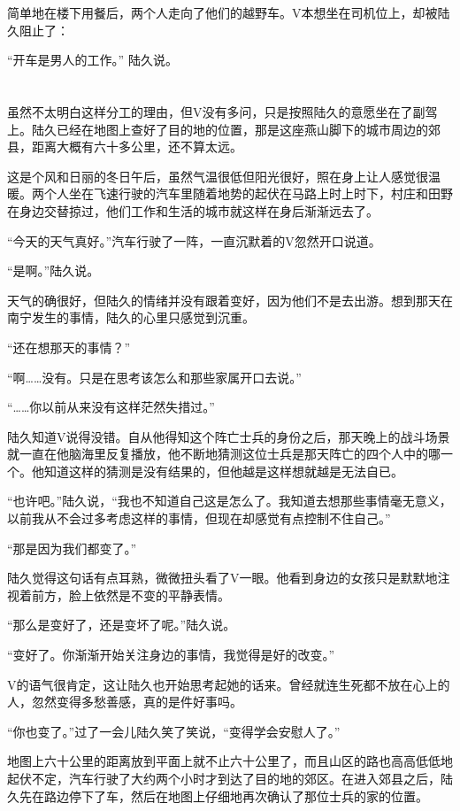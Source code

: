 简单地在楼下用餐后，两个人走向了他们的越野车。V本想坐在司机位上，却被陆久阻止了：

“开车是男人的工作。” 陆久说。

\section*{}

虽然不太明白这样分工的理由，但V没有多问，只是按照陆久的意愿坐在了副驾上。陆久已经在地图上查好了目的地的位置，那是这座燕山脚下的城市周边的郊县，距离大概有六十多公里，还不算太远。

这是个风和日丽的冬日午后，虽然气温很低但阳光很好，照在身上让人感觉很温暖。两个人坐在飞速行驶的汽车里随着地势的起伏在马路上时上时下，村庄和田野在身边交替掠过，他们工作和生活的城市就这样在身后渐渐远去了。

“今天的天气真好。”汽车行驶了一阵，一直沉默着的V忽然开口说道。

“是啊。”陆久说。

天气的确很好，但陆久的情绪并没有跟着变好，因为他们不是去出游。想到那天在南宁发生的事情，陆久的心里只感觉到沉重。

“还在想那天的事情？”

“啊……没有。只是在思考该怎么和那些家属开口去说。”

“……你以前从来没有这样茫然失措过。”

陆久知道V说得没错。自从他得知这个阵亡士兵的身份之后，那天晚上的战斗场景就一直在他脑海里反复播放，他不断地猜测这位士兵是那天阵亡的四个人中的哪一个。他知道这样的猜测是没有结果的，但他越是这样想就越是无法自已。

“也许吧。”陆久说，“我也不知道自己这是怎么了。我知道去想那些事情毫无意义，以前我从不会过多考虑这样的事情，但现在却感觉有点控制不住自己。”

“那是因为我们都变了。”

陆久觉得这句话有点耳熟，微微扭头看了V一眼。他看到身边的女孩只是默默地注视着前方，脸上依然是不变的平静表情。

“那么是变好了，还是变坏了呢。”陆久说。

“变好了。你渐渐开始关注身边的事情，我觉得是好的改变。”

V的语气很肯定，这让陆久也开始思考起她的话来。曾经就连生死都不放在心上的人，忽然变得多愁善感，真的是件好事吗。

“你也变了。”过了一会儿陆久笑了笑说，“变得学会安慰人了。”

地图上六十公里的距离放到平面上就不止六十公里了，而且山区的路也高高低低地起伏不定，汽车行驶了大约两个小时才到达了目的地的郊区。在进入郊县之后，陆久先在路边停下了车，然后在地图上仔细地再次确认了那位士兵的家的位置。

